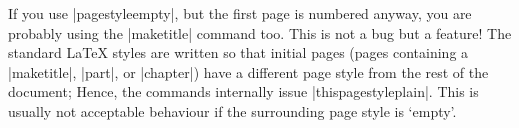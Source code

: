 \begin{changemargin}{-1cm}{-1cm}







If you use \cs|pagestyle{empty}|, but the first page is numbered anyway,
you are probably using the \cs|maketitle| command too. This is not a bug
but a feature! The standard \LaTeX{} styles are written so that
initial pages (pages containing a \cs|maketitle|, \cs|part|, or
\cs|chapter|) have a different page style from the rest of the document; 
Hence, the commands internally issue \cs|thispagestyle{plain}|. This is
usually not acceptable behaviour if the surrounding page style is
`empty'.


\end{changemargin}
